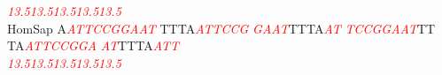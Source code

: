 \documentclass[11pt,twoside,reqno,a4paper]{article}
\begin{document}
{\hspace*{7\charwidth}\hspace*{1\charwidth}\textit{\textcolor{red}{13.5}}\hspace*{1\charwidth}\hspace*{10\charwidth}\textit{\textcolor{red}{13.5}}\hspace*{1\charwidth}\hspace*{10\charwidth}\textit{\textcolor{red}{13.5}}\hspace*{1\charwidth}\hspace*{1\charwidth}\hspace*{10\charwidth}\textit{\textcolor{red}{13.5}}\hspace*{1\charwidth}\hspace*{10\charwidth}\textit{\textcolor{red}{13.5}}\hspace*{1\charwidth}\\
HomSap	A\textit{\textcolor{red}{A}}\textit{\textcolor{red}{T}}\textit{\textcolor{red}{T}}\textit{\textcolor{red}{C}}\textit{\textcolor{red}{C}}\textit{\textcolor{red}{G}}\textit{\textcolor{red}{G}}\textit{\textcolor{red}{A}}\textit{\textcolor{red}{A}}\textit{\textcolor{red}{T}}	TTTA\textit{\textcolor{red}{A}}\textit{\textcolor{red}{T}}\textit{\textcolor{red}{T}}\textit{\textcolor{red}{C}}\textit{\textcolor{red}{C}}\textit{\textcolor{red}{G}}	\textit{\textcolor{red}{G}}\textit{\textcolor{red}{A}}\textit{\textcolor{red}{A}}\textit{\textcolor{red}{T}}TTTA\textit{\textcolor{red}{A}}\textit{\textcolor{red}{T}}	\textit{\textcolor{red}{T}}\textit{\textcolor{red}{C}}\textit{\textcolor{red}{C}}\textit{\textcolor{red}{G}}\textit{\textcolor{red}{G}}\textit{\textcolor{red}{A}}\textit{\textcolor{red}{A}}\textit{\textcolor{red}{T}}TT	TA\textit{\textcolor{red}{A}}\textit{\textcolor{red}{T}}\textit{\textcolor{red}{T}}\textit{\textcolor{red}{C}}\textit{\textcolor{red}{C}}\textit{\textcolor{red}{G}}\textit{\textcolor{red}{G}}\textit{\textcolor{red}{A}}	\textit{\textcolor{red}{A}}\textit{\textcolor{red}{T}}TTTA\textit{\textcolor{red}{A}}\textit{\textcolor{red}{T}}\textit{\textcolor{red}{T}}\\
\hspace*{7\charwidth}\hspace*{1\charwidth}\textit{\textcolor{red}{13.5}}\hspace*{1\charwidth}\hspace*{10\charwidth}\textit{\textcolor{red}{13.5}}\hspace*{1\charwidth}\hspace*{10\charwidth}\textit{\textcolor{red}{13.5}}\hspace*{1\charwidth}\hspace*{1\charwidth}\hspace*{10\charwidth}\textit{\textcolor{red}{13.5}}\hspace*{1\charwidth}\hspace*{10\charwidth}\textit{\textcolor{red}{13.5}}\hspace*{1\charwidth}\\
}
\end{document}
